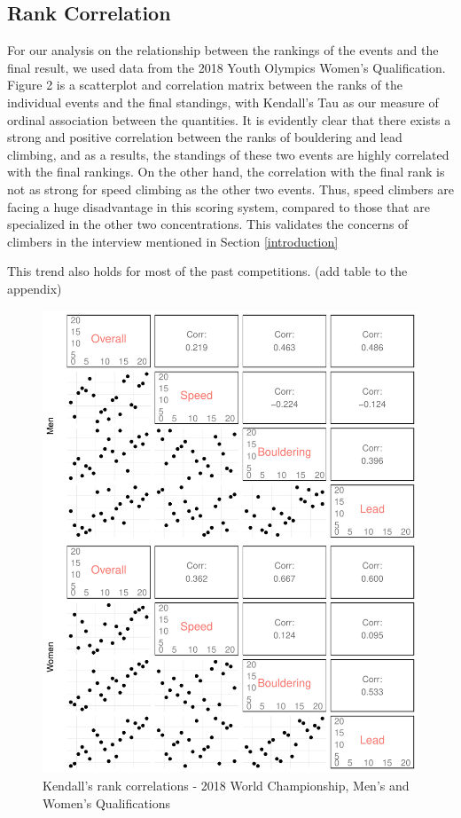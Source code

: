 \documentclass[12pt]{article}
\begin{document}
\hypertarget{rank-correlation}{%
\subsection{Rank Correlation}\label{rank-correlation}}

For our analysis on the relationship between the rankings of the events
and the final result, we used data from the 2018 Youth Olympics Women's
Qualification. Figure 2 is a scatterplot and correlation matrix between
the ranks of the individual events and the final standings, with
Kendall's Tau \citep{kendall1938} as our measure of ordinal association
between the quantities. It is evidently clear that there exists a strong
and positive correlation between the ranks of bouldering and lead
climbing, and as a results, the standings of these two events are highly
correlated with the final rankings. On the other hand, the correlation
with the final rank is not as strong for speed climbing as the other two
events. Thus, speed climbers are facing a huge disadvantage in this
scoring system, compared to those that are specialized in the other two
concentrations. This validates the concerns of climbers in the interview
mentioned in Section \ref{introduction}

This trend also holds for most of the past competitions. (add table to
the appendix)

\begin{figure}
\centering
\includegraphics{draft_files/figure-latex/unnamed-chunk-9-1.pdf}
\caption{Kendall's rank correlations - 2018 World Championship, Men's
and Women's Qualifications}
\end{figure}
\end{document}
